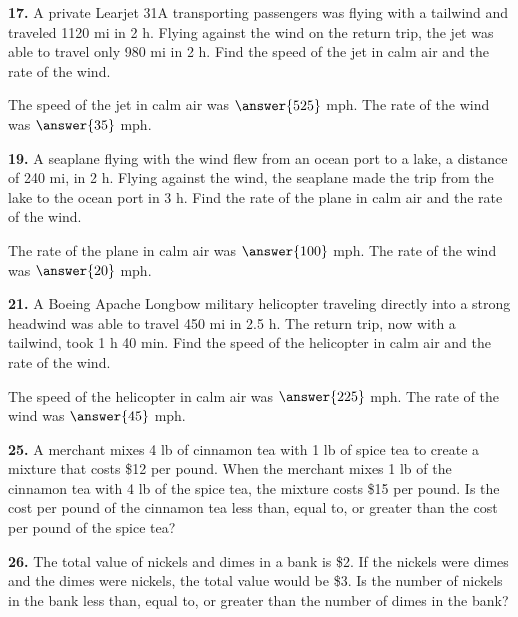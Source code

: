 \documentclass{ximera}
\begin{document}
\begin{problem}
\textbf{17.} A private Learjet 31A transporting passengers was flying with a tailwind and
  traveled 1120 mi in 2 h. Flying against the wind on the return trip, the jet was able to
  travel only 980 mi in 2 h. Find the speed of the jet in calm air and the rate of the
  wind.

The speed of the jet in calm air was $\answer{525}$ mph. The rate of the wind was $\answer{35}$ mph.
\end{problem}

\begin{problem}
\textbf{19.} A seaplane flying with the wind flew from an ocean port to a lake, a distance of
  240 mi, in 2 h. Flying against the wind, the seaplane made the trip from the lake to the
  ocean port in 3 h. Find the rate of the plane in calm air and the rate of the wind.

The rate of the plane in calm air was $\answer{100}$ mph. The rate of the wind was $\answer{20}$ mph.
\end{problem}

\begin{problem}
\textbf{21.} A Boeing Apache Longbow military helicopter traveling directly into a strong
  headwind was able to travel 450 mi in 2.5 h. The return trip, now with a tailwind, took
  1 h 40 min. Find the speed of the helicopter in calm air and the rate of the wind.

The speed of the helicopter in calm air was $\answer{225}$ mph. The rate of the wind was $\answer{45}$ mph.
\end{problem}

\begin{problem}
\textbf{25.} A merchant mixes 4 lb of cinnamon tea with 1 lb of spice tea to create a mixture
  that costs \$12 per pound. When the merchant mixes 1 lb of the cinnamon tea with 4 lb of
  the spice tea, the mixture costs \$15 per pound. Is the cost per pound of the cinnamon
  tea less than, equal to, or greater than the cost per pound of the spice tea?

\begin{multipleChoice} 
\end{multipleChoice}
\end{problem}

\begin{problem}
\textbf{26.} The total value of nickels and dimes in a bank is \$2. If the nickels were dimes
  and the dimes were nickels, the total value would be \$3. Is the number of nickels in
  the bank less than, equal to, or greater than the number of dimes in the bank?

\begin{multipleChoice} 
\end{multipleChoice}
\end{problem}
\end{document}
